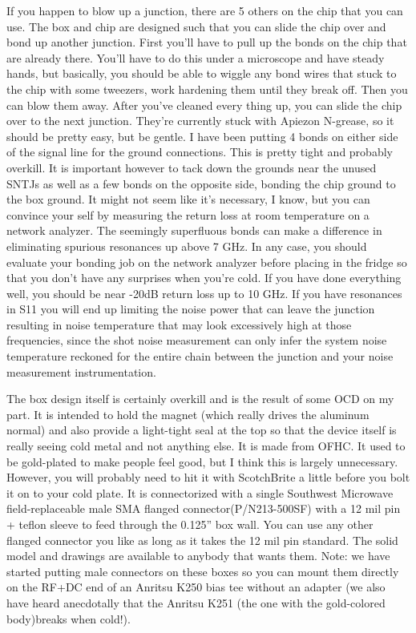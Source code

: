 \documentclass[11pt]{article}
\begin{document}
If you happen to blow up a junction, there are 5 others on the chip that you can use. The box and chip are designed such that you can slide the chip over and bond up another junction. First you’ll have to pull up the bonds on the chip that are already there. You’ll have to do this under a microscope and have steady hands, but basically, you should be able to wiggle any bond wires that stuck to the chip with some tweezers, work hardening them until they break oﬀ. Then you can blow them away. After you’ve cleaned every thing up, you can slide the chip over to the next junction.  They’re currently stuck with Apiezon N-grease, so it should be pretty easy, but be gentle. I have been putting 4 bonds on either side of the signal line for the ground connections. This is pretty tight and probably overkill. It is important however to tack down the grounds near the unused SNTJs as well as a few bonds on the opposite side, bonding the chip ground to the box ground. It might not seem like it’s necessary, I know, but you can convince your self by measuring the return loss at room temperature on a network analyzer. The seemingly superﬂuous bonds can make a diﬀerence in eliminating spurious resonances up above 7 GHz. In any case, you should evaluate your bonding job on the network analyzer before placing in the fridge so that you don’t have any surprises when you’re cold. If you have done everything well, you should be near -20dB return loss up to 10 GHz. If you have resonances in S11 you will end up limiting the noise power that can leave the junction resulting in noise temperature that may look excessively high at those frequencies, since the shot noise measurement can only infer the system noise temperature reckoned for the entire chain between the junction and your noise measurement instrumentation.




The box design itself is certainly overkill and is the result of some OCD on my part. It is intended to hold the magnet (which really drives the aluminum normal) and also provide a light-tight seal at the top so that the device itself is really seeing cold metal and not anything else. It is made from OFHC. It used to be gold-plated to make people feel good, but I think this is largely unnecessary. However, you will probably need to hit it with ScotchBrite a little before you bolt it on to your cold plate. It is connectorized with a single Southwest Microwave ﬁeld-replaceable male SMA ﬂanged connector(P/N213-500SF) with a 12 mil pin + teﬂon sleeve to feed through the 0.125” box wall. You can use any other ﬂanged connector you like as long as it takes the 12 mil pin standard. The solid model and drawings are available to anybody that wants them. Note: we have started putting male connectors on these boxes so you can mount them directly on the RF+DC end of an Anritsu K250 bias tee without an adapter (we also have heard anecdotally that the Anritsu K251 (the one with the gold-colored body)breaks when cold!).
\end{document}
